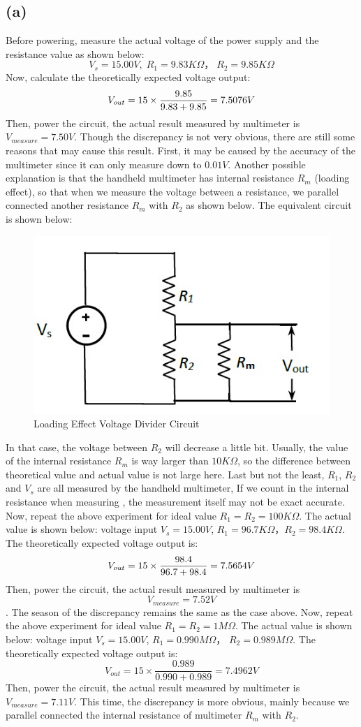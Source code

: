\documentclass[letterpaper]{article}
\begin{document}
\subsection*{(a)}
Before powering, measure the actual voltage of the power supply and the resistance value as shown below:
$$V_s = 15.00V,\;  R_1 = 9.83K\Omega，\; R_2=9.85 K\Omega$$
Now, calculate the theoretically expected voltage output:
$$V_{out}= 15\times \frac{\displaystyle 9.85}{\displaystyle 9.83+9.85}=7.5076 V$$
Then, power the circuit, the actual result measured by multimeter is $V_{measure}=7.50 V$.
Though the discrepancy is not very obvious, there are still some reasons that may cause this result. First, it may be caused by the accuracy of the multimeter since it can only measure down to $0.01V$. Another possible explanation is that the handheld multimeter has internal resistance $R_m$ (loading effect), so that when we measure the voltage between a resistance, we parallel connected another resistance $R_m$ with $R_2$ as shown below.
The equivalent circuit is shown below:
\begin{figure}[H]
	\centering
	\includegraphics[scale=1.0]{q3circuit.png}
	\caption{Loading Effect Voltage Divider Circuit}
	\label{fig:load}
\end{figure}
In that case, the voltage between $R_2$ will decrease a little bit. Usually, the value of the internal resistance $R_m$ is way larger than $10K\Omega$, so the difference between theoretical value and actual value is not large here. Last but not the least, $R_1$, $R_2$ and $V_s$ are all measured by the handheld multimeter, If we count in the internal resistance when measuring , the measurement itself may not be exact accurate. Now, repeat the above experiment for ideal value $R_1=R_2=100 K\Omega$.
The actual value is shown below:
voltage input $V_s = 15.00V$,  $R_1 = 96.7K\Omega$，$R_2=98.4 K\Omega$.
The theoretically expected voltage output is:
$$V_{out}= 15\times \frac{\displaystyle 98.4}{\displaystyle 96.7+98.4}=7.5654 V$$
Then, power the circuit, the actual result measured by multimeter is $$V_{measure}=7.52 V$$.
The season of the discrepancy remains the same as the case above. Now, repeat the above experiment for ideal value $R_1=R_2=1 M\Omega$.
The actual value is shown below:
voltage input $V_s = 15.00V$,  $R_1 = 0.990M\Omega$， $R_2=0.989 M\Omega$.
The theoretically expected voltage output is:
$$V_{out}= 15\times \frac{0.989}{0.990+0.989}=7.4962 V$$
Then, power the circuit, the actual result measured by multimeter is $V_{measure}=7.11 V$.
This time, the discrepancy is more obvious, mainly because we parallel connected the internal resistance of multimeter $R_m$ with $R_2$.
\end{document}
